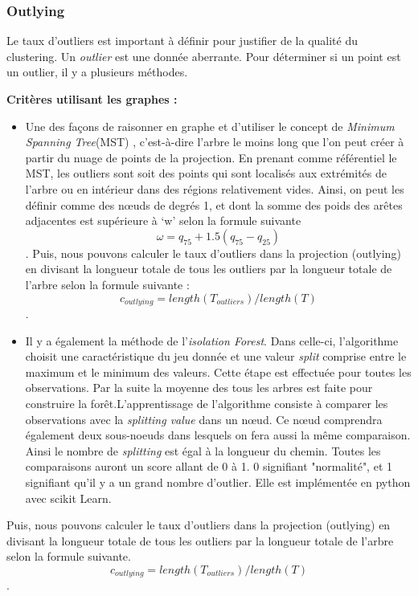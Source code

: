 \subsubsection{Outlying}

Le taux d’outliers est important à définir pour justifier de la qualité du clustering.
Un \textit{outlier} est une donnée aberrante. Pour déterminer si un point est un outlier, il y a plusieurs méthodes.

\textbf{Critères utilisant les graphes :}
\begin{itemize}
    \item Une des façons de raisonner en graphe et d'utiliser le concept de \textit{Minimum Spanning Tree}(MST) \cite{wilkinson2005graph-MST} , c'est-à-dire l'arbre le moins long que l'on peut créer à partir du nuage de points de la projection. 
    En prenant comme référentiel le MST, les outliers sont soit des points qui sont localisés aux extrémités de l’arbre ou en intérieur dans des régions relativement vides. Ainsi, on peut les définir comme des nœuds de degrés 1, et dont la somme des poids des arêtes adjacentes est supérieure à ‘w’ selon la formule suivante  \[ \omega = q_{75} + 1.5 (q_{75} - q_{25} ) \].
    Puis, nous pouvons calculer le taux d’outliers dans la projection (outlying) en divisant la longueur totale de tous les outliers par la longueur totale de l’arbre selon la formule suivante : \[c_{outlying} = length(T_{outliers} )/length(T) \] .
    \item Il y a également la méthode de l’\textit{isolation Forest}. Dans celle-ci, l’algorithme choisit une caractéristique du jeu donnée et une valeur \textit{split} comprise entre le maximum et le minimum des valeurs. Cette étape est effectuée pour toutes les observations. Par la suite la moyenne des tous les arbres est faite pour construire la forêt.L'apprentissage de l’algorithme consiste à comparer les observations avec la \textit{splitting value} dans un nœud. Ce nœud comprendra également deux sous-noeuds dans lesquels on fera aussi la même comparaison. Ainsi le nombre de \textit{splitting} est égal à la longueur du chemin. Toutes les comparaisons auront un score allant de 0 à 1. 0 signifiant "normalité", et 1 signifiant qu’il y a un grand nombre d’outlier\cite{togbe2020anomaly-IsolationForest}. Elle est implémentée en python avec scikit Learn.
\end{itemize} 

Puis, nous pouvons calculer le taux d’outliers dans la projection (outlying) en divisant la
longueur totale de tous les outliers par la longueur totale de l’arbre selon la formule suivante.
\[c_{outlying} = length(T_{outliers} )/length(T) \].

